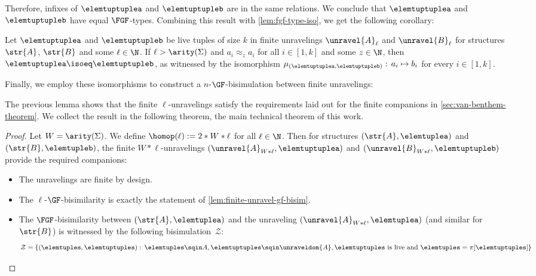 Therefore, infixes of $\elemtuptuplea$ and $\elemtuptupleb$ are in the same relations.
We conclude that $\elemtuptuplea$ and $\elemtuptupleb$ have equal $\FGF$-types.
Combining this result with \cref{lem:fgf-type-iso}, we get the following corollary:
\begin{corollary}\label{cor:tuple-similar-iso}
  Let $\elemtuptuplea$ and $\elemtuptupleb$ be live tuples of size $k$ in finite unravelings $\unravel{A}_{\ell}$ and $\unravel{B}_{\ell}$ for structures $\str{A}$, $\str{B}$ and some $\ell \in \N$.
  If $\ell > \arity(\Sigma)$ and $a_{i} \approx_{z} a_{i}$ for all $i \in [1,k]$ and some $z \in \N$, then $\elemtuptuplea \isoeq \elemtuptupleb$, as witnessed by the isomorphism $\mu_{(\elemtuptuplea, \elemtuptupleb)}:\, a_{i} \mapsto b_{i}$ for every $i \in [1, k]$.
\end{corollary}
Finally, we employ these isomorphisms to construct a $n$-$\GF$-bisimulation between finite unravelings:


The previous lemma shows that the finite $\ell$-unravelings satisfy the requirements laid out for the finite companions in \cref{sec:van-benthem-theorem}.
We collect the result in the following theorem, the main technical theorem of this work.
\maintechnicalthm
\begin{proof}
  Let $W = \arity(\Sigma)$. We define $\homop(\ell) := 2 * W * \ell$ for all $\ell \in \N$.
  Then for structures $(\str{A}, \elemtuplea)$ and $(\str{B}, \elemtupleb)$, the finite $W * \ell$-unravelings $(\unravel{A}_{W * \ell}, \elemtuptuplea)$ and $(\unravel{B}_{W * \ell}, \elemtuptupleb)$ provide the required companions:
  \begin{itemize}
    \item The unravelings are finite by design.
    \item The $\ell$-$\GF$-bisimilarity is exactly the statement of \cref{lem:finite-unravel-gf-bisim}.
    \item The $\FGF$-bisimilarity between $(\str{A}, \elemtuplea)$ and the unraveling $(\unravel{A}_{W * \ell}, \elemtuplea)$ (and similar for $\str{B}$) is witnessed by the following bisimulation~$\mathcal{Z}$:
          \begin{equation*}
            \mathcal{Z} = \{ (\elemtuples, \elemtuptuples):\, \elemtuples \sqin A, \elemtuptuples \sqin \unraveldom{A}, \elemtuptuples \text{ is live and } \elemtuples = \pi[\elemtuptuples] \}
          \end{equation*}
  \end{itemize}
\end{proof}
